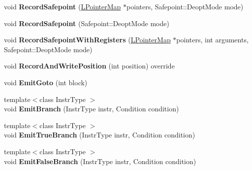 \begin{DoxyCompactItemize}
\item 
void {\bfseries Record\+Safepoint} (\hyperlink{classv8_1_1internal_1_1_l_pointer_map}{L\+Pointer\+Map} $\ast$pointers, Safepoint\+::\+Deopt\+Mode mode)\hypertarget{classv8_1_1internal_1_1_l_code_gen_a7f742e0bc068c384673a3490e15b230c}{}\label{classv8_1_1internal_1_1_l_code_gen_a7f742e0bc068c384673a3490e15b230c}

\item 
void {\bfseries Record\+Safepoint} (Safepoint\+::\+Deopt\+Mode mode)\hypertarget{classv8_1_1internal_1_1_l_code_gen_a3621dccea782082b57057f617a9dd24a}{}\label{classv8_1_1internal_1_1_l_code_gen_a3621dccea782082b57057f617a9dd24a}

\item 
void {\bfseries Record\+Safepoint\+With\+Registers} (\hyperlink{classv8_1_1internal_1_1_l_pointer_map}{L\+Pointer\+Map} $\ast$pointers, int arguments, Safepoint\+::\+Deopt\+Mode mode)\hypertarget{classv8_1_1internal_1_1_l_code_gen_a15c074803ff1d0270234efb3e8830c75}{}\label{classv8_1_1internal_1_1_l_code_gen_a15c074803ff1d0270234efb3e8830c75}

\item 
void {\bfseries Record\+And\+Write\+Position} (int position) override\hypertarget{classv8_1_1internal_1_1_l_code_gen_a7f2c2fb5fe21ed4f96fa43839a3c459d}{}\label{classv8_1_1internal_1_1_l_code_gen_a7f2c2fb5fe21ed4f96fa43839a3c459d}

\item 
void {\bfseries Emit\+Goto} (int block)\hypertarget{classv8_1_1internal_1_1_l_code_gen_a77ef06fc94dce505c88f628d129c114d}{}\label{classv8_1_1internal_1_1_l_code_gen_a77ef06fc94dce505c88f628d129c114d}

\item 
{\footnotesize template$<$class Instr\+Type $>$ }\\void {\bfseries Emit\+Branch} (Instr\+Type instr, Condition condition)\hypertarget{classv8_1_1internal_1_1_l_code_gen_af34ca2c4fbc9ddc61b5d7c6c46695b07}{}\label{classv8_1_1internal_1_1_l_code_gen_af34ca2c4fbc9ddc61b5d7c6c46695b07}

\item 
{\footnotesize template$<$class Instr\+Type $>$ }\\void {\bfseries Emit\+True\+Branch} (Instr\+Type instr, Condition condition)\hypertarget{classv8_1_1internal_1_1_l_code_gen_af5f134222fdb005529a62b0eac9c41e5}{}\label{classv8_1_1internal_1_1_l_code_gen_af5f134222fdb005529a62b0eac9c41e5}

\item 
{\footnotesize template$<$class Instr\+Type $>$ }\\void {\bfseries Emit\+False\+Branch} (Instr\+Type instr, Condition condition)\hypertarget{classv8_1_1internal_1_1_l_code_gen_aea56de5987e8e4906c8289d9d20f4f28}{}\label{classv8_1_1internal_1_1_l_code_gen_aea56de5987e8e4906c8289d9d20f4f28}


\end{DoxyCompactItemize}
